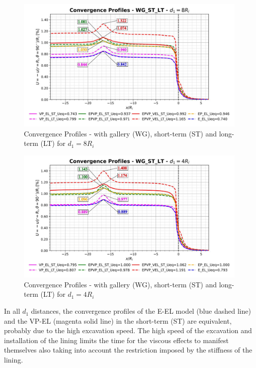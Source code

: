 \documentclass[a4paper,fleqn]{cas-sc}
\begin{document}
\FloatBarrier
\begin{figure}[h!]
	\centering
	\includegraphics[scale=0.5]{Convergence Profiles - WG_ST_LT - $d_1=8R_i$.pdf}
	\caption{Convergence Profiles - with gallery (WG), short-term (ST) and long-term (LT) for $d_1 = 8R_i$}
	\label{WG-ST-LT-D1-8RI}
\end{figure}
\FloatBarrier
\begin{figure}[h!]
	\centering
	\includegraphics[scale=0.5]{Convergence Profiles - WG_ST_LT - $d_1=4R_i$.pdf}
	\caption{Convergence Profiles - with gallery (WG), short-term (ST) and long-term (LT) for $d_1 = 4R_i$}
	\label{WG-ST-LT-D1-4RI}
\end{figure}
\FloatBarrier
In all $d_1$ distances, the convergence profiles of the E-EL model (blue dashed line) and the VP-EL (magenta solid line) in the short-term (ST) are equivalent, probably due to the high excavation speed. The high speed of the excavation and installation of the lining limits the time for the viscous effects to manifest themselves also taking into account the restriction imposed by the stiffness of the lining.
\end{document}
